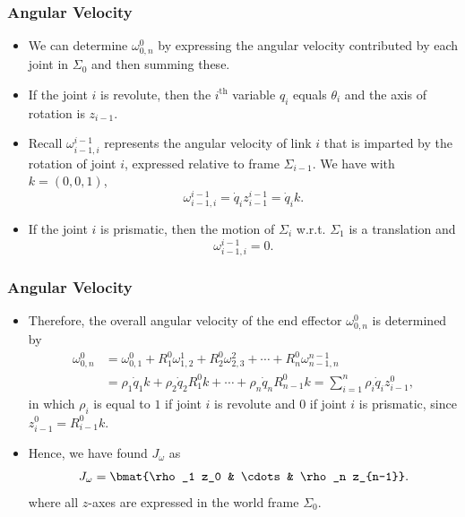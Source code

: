 \begin{frame}
    \frametitle{Angular Velocity}

    \begin{itemize}
        \item We can determine $\omega_{0,n}^0$ by expressing the angular velocity 
        contributed by each joint in $\Sigma_0$ and then summing these.
        \item If the joint $i$ is revolute, then the $i^{\textrm{th}}$ variable 
        $q_i$ equals $\theta_i$ and the axis of rotation is $z_{i-1}$.
        \item Recall $\omega_{i-1,i}^{i-1}$ represents the angular velocity of
        link $i$ that is imparted by the rotation of joint $i$, expressed
        relative to frame $\Sigma_{i-1}$. We have with $k = (0, 0, 1)$,
        \[ \omega_{i-1,i}^{i-1} = \dot{q}_i z_{i-1}^{i-1} = \dot{q}_ik. \]
        \item If the joint $i$ is prismatic, then the motion of $\Sigma_i$
        w.r.t. $\Sigma_1$ is a translation and \[ \omega_{i-1,i}^{i-1} = 0. \]
    \end{itemize}
\end{frame}

\begin{frame}
    \frametitle{Angular Velocity}

    \begin{itemize}
        \item Therefore, the overall angular velocity of the end effector
        $\omega_{0,n}^0$ is determined by 
        \begin{align*}
            \omega_{0,n}^0 &= \omega_{0,1}^0 + R_1^0\omega_{1,2}^1 + R_2^0\omega_{2,3}^2 + \cdots + R_n^0\omega_{n-1,n}^{n-1} \\ 
            &= \rho_1 \dot{q}_1k + \rho_2 \dot{q}_2R_1^0k + \cdots + \rho_n\dot{q}_nR_{n-1}^0k = \sum_{i=1}^n \rho_i \dot{q}_i z_{i-1}^0,
        \end{align*}
        in which $\rho_i$ is equal to $1$ if joint $i$ is revolute and $0$ if
        joint $i$ is prismatic, since $z_{i-1}^0 = R_{i-1}^0k$.
        \item Hence, we have found $J_\omega$ as 
        \begin{equation}
            J_\omega = \bmat{\rho_1 z_0 & \cdots & \rho_n z_{n-1}}.
            \label{eq:jac_omega}
        \end{equation}
        where all $z$-axes are expressed in the world frame $\Sigma_0$.
    \end{itemize}
\end{frame}


